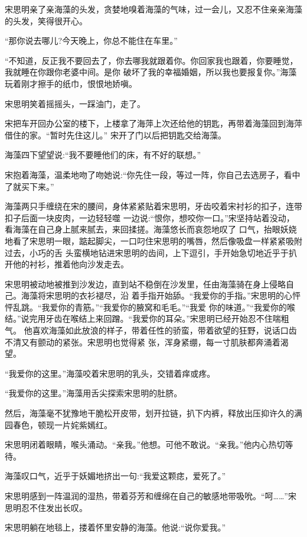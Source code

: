 \documentclass[11pt,a4paper,onecolumn]{article}
\begin{document}
宋思明亲了亲海藻的头发，贪婪地嗅着海藻的气味，过一会儿，又忍不住亲亲海藻的头发，笑得很开心。

``那你说去哪儿?今天晚上，你总不能住在车里。''

``不知道，反正我不要回去了，你去哪我就跟着你。你回家我也跟着，你要睡觉，我就睡在你跟你老婆中间。是你
破坏了我的幸福婚姻，所以我也要报复你。''海藻玩着刚才擦手的纸巾，恨恨地娇嗔。

宋思明笑着摇摇头，一踩油门，走了。

宋把车开回办公室的楼下，上楼拿了海萍上次还给他的钥匙，再带着海藻回到海萍借住的家。``暂时先住这儿。''
宋开了门以后把钥匙交给海藻。

海藻四下望望说:``我不要睡他们的床，有不好的联想。''

宋抱着海藻，温柔地吻了吻她说:``你先住一段，等过一阵，你自己去选房子，看中了就买下来。''

海藻两只手缠绕在宋的腰间，身体紧紧贴着宋思明，牙齿咬着宋衬衫的扣子，连带扣子后面一块皮肉，一边轻轻噬
一边说:``恨你，想咬你一口。''宋坚持站着没动，看海藻在自己身上腻来腻去，来回揉搓。海藻悠长而哀怨地叹了
口气，抬眼妖娆地看了宋思明一眼，踮起脚尖，一口叼住宋思明的嘴唇，然后像吸盘一样紧紧吸附过去，小巧的舌
头蛮横地钻进宋思明的齿间，上下逗引，手开始急切地近乎于扒开他的衬衫，推着他向沙发走去。

宋思明被动地被推到沙发边，直到站不稳倒在沙发里，任由海藻骑在身上侵略自己。海藻将宋思明的衣衫褪尽，沿
着手指开始舔。``我爱你的手指。''宋思明的心怦怦乱跳。``我爱你的青筋。''``我爱你的腋窝和毛毛。''``我爱
你的味道。''``我爱你的喉结。''说完用牙齿在喉结上来回蹭。``我爱你的耳朵。''宋思明已经开始忍不住喘粗气。
他喜欢海藻如此放浪的样子，带着任性的骄蛮，带着欲望的狂野，说话口齿不清又有颤动的紧张。宋思明也觉得紧
张，浑身紧绷，每一寸肌肤都奔涌着渴望。

``我爱你的这里。''海藻咬着宋思明的乳头，交错着痒或疼。

``我爱你的这里。''海藻用舌尖探索宋思明的肚脐。

然后，海藻毫不犹豫地干脆松开皮带，划开拉链，扒下内裤，释放出压抑许久的满园春色，顿现一片姹紫嫣红。

宋思明闭着眼睛，喉头涌动。``亲我。''他想。可他不敢说。``亲我。''他内心热切等待。

海藻叹口气，近乎于妖媚地挤出一句:``我爱这颗痣，爱死了。''

宋思明感到一阵温润的湿热，带着芬芳和缠绵在自己的敏感地带吸吮。``呵……''宋思明忍不住发出长叹。

宋思明躺在地毯上，搂着怀里安静的海藻。他说:``说你爱我。''
\end{document}
